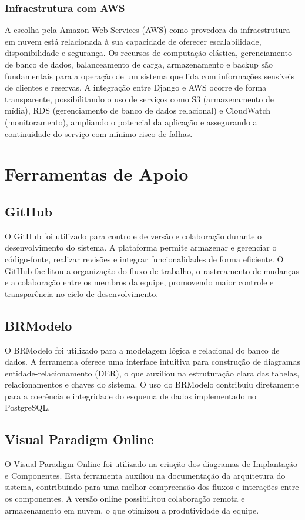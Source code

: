 \documentclass[
	12pt,				%
	openany,			%
	twoside,			%
	a4paper,			%
	english,			%
	french,				%
	spanish,			%
	brazil				%
	]{abntex2}
\begin{document}
\subsubsection{Infraestrutura com AWS}
A escolha pela Amazon Web Services (AWS) como provedora da infraestrutura em nuvem está relacionada à sua capacidade de oferecer escalabilidade, disponibilidade e segurança. Os recursos de computação elástica, gerenciamento de banco de dados, balanceamento de carga, armazenamento e backup são fundamentais para a operação de um sistema que lida com informações sensíveis de clientes e reservas.
A integração entre Django e AWS ocorre de forma transparente, possibilitando o uso de serviços como S3 (armazenamento de mídia), RDS (gerenciamento de banco de dados relacional) e CloudWatch (monitoramento), ampliando o potencial da aplicação e assegurando a continuidade do serviço com mínimo risco de falhas.


\section{Ferramentas de Apoio}
\subsection{GitHub}
O GitHub foi utilizado para controle de versão e colaboração durante o desenvolvimento do sistema. A plataforma permite armazenar e gerenciar o código-fonte, realizar revisões e integrar funcionalidades de forma eficiente. O GitHub facilitou a organização do fluxo de trabalho, o rastreamento de mudanças e a colaboração entre os membros da equipe, promovendo maior controle e transparência no ciclo de desenvolvimento.
\subsection{BRModelo}
O BRModelo foi utilizado para a modelagem lógica e relacional do banco de dados. A ferramenta oferece uma interface intuitiva para construção de diagramas entidade-relacionamento (DER), o que auxiliou na estruturação clara das tabelas, relacionamentos e chaves do sistema. O uso do BRModelo contribuiu diretamente para a coerência e integridade do esquema de dados implementado no PostgreSQL.
\subsection{Visual Paradigm Online}
O Visual Paradigm Online foi utilizado na criação dos diagramas de Implantação e Componentes. Esta ferramenta auxiliou na documentação da arquitetura do sistema, contribuindo para uma melhor compreensão dos fluxos e interações entre os componentes. A versão online possibilitou colaboração remota e armazenamento em nuvem, o que otimizou a produtividade da equipe.
\end{document}
